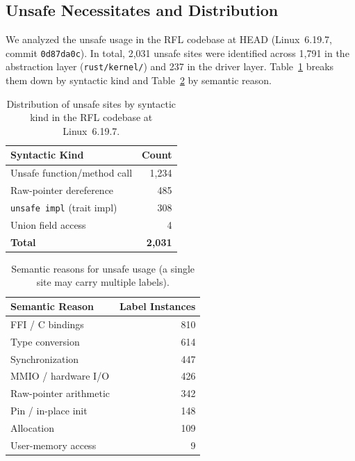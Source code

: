 \subsection{Unsafe Necessitates and Distribution}

We analyzed the unsafe usage in the RFL codebase at HEAD (Linux~6.19.7, commit \texttt{0d87da0c}).
In total, 2{,}031 unsafe sites were identified across 1{,}791 in the abstraction layer (\texttt{rust/kernel/}) and 237 in the driver layer.
Table~\ref{tab:unsafe-kind} breaks them down by syntactic kind and Table~\ref{tab:unsafe-label} by semantic reason.

\begin{table}[h]
    \centering
    \begin{tabular}{lr}
    \hline
    \textbf{Syntactic Kind} & \textbf{Count} \\
    \hline
    Unsafe function/method call   & 1{,}234 \\
    Raw-pointer dereference        &   485 \\
    \texttt{unsafe impl} (trait impl) &   308 \\
    Union field access             &     4 \\
    \hline
    \textbf{Total}                & \textbf{2{,}031} \\
    \hline
    \end{tabular}
    \caption{Distribution of unsafe sites by syntactic kind in the RFL codebase at Linux~6.19.7.}
    \label{tab:unsafe-kind}
\end{table}

\begin{table}[h]
    \centering
    \begin{tabular}{lr}
    \hline
    \textbf{Semantic Reason} & \textbf{Label Instances} \\
    \hline
    FFI / C bindings    & 810 \\
    Type conversion     & 614 \\
    Synchronization     & 447 \\
    MMIO / hardware I/O & 426 \\
    Raw-pointer arithmetic & 342 \\
    Pin / in-place init & 148 \\
    Allocation          & 109 \\
    User-memory access  &   9 \\
    \hline
    \end{tabular}
    \caption{Semantic reasons for unsafe usage (a single site may carry multiple labels).}
    \label{tab:unsafe-label}
\end{table}

